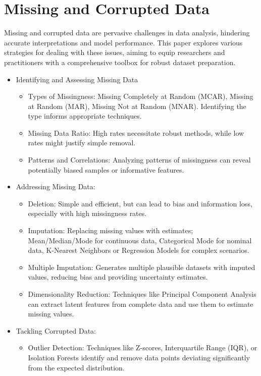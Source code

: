 \section{Missing and Corrupted Data}
    Missing and corrupted data are pervasive challenges in data analysis, hindering accurate interpretations and model performance. This paper explores various strategies for dealing with these issues, aiming to equip researchers and practitioners with a comprehensive toolbox for robust dataset preparation.
    \begin{itemize}
        \item Identifying and Assessing Missing Data
            \begin{itemize}
                \item Types of Missingness: Missing Completely at Random (MCAR), Missing at Random (MAR), Missing Not at Random (MNAR). Identifying the type informs appropriate techniques.
                \item Missing Data Ratio: High rates necessitate robust methods, while low rates might justify simple removal.
                \item Patterns and Correlations: Analyzing patterns of missingness can reveal potentially biased samples or informative features.
            \end{itemize}
        \item Addressing Missing Data:
            \begin{itemize}
                \item Deletion: Simple and efficient, but can lead to bias and information loss, especially with high missingness rates.
                \item Imputation: Replacing missing values with estimates; Mean/Median/Mode for continuous data, Categorical Mode for nominal data, K-Nearest Neighbors or Regression Models for complex scenarios.
                \item Multiple Imputation: Generates multiple plausible datasets with imputed values, reducing bias and providing uncertainty estimates.
                \item Dimensionality Reduction: Techniques like Principal Component Analysis can extract latent features from complete data and use them to estimate missing values.
            \end{itemize}
        \item Tackling Corrupted Data:
            \begin{itemize}
                \item Outlier Detection: Techniques like Z-scores, Interquartile Range (IQR), or Isolation Forests identify and remove data points deviating significantly from the expected distribution.

\end{itemize}
\end{itemize}
